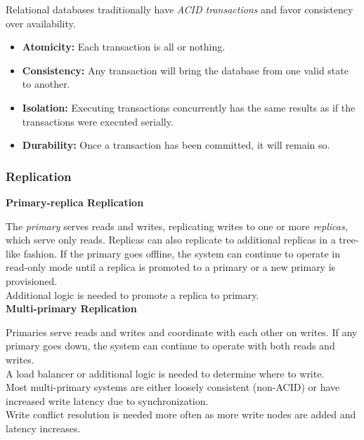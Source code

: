 \documentclass[12pt, titlepage]{article}
\begin{document}
Relational databases traditionally have \textit{ACID transactions} and favor consistency over availability. \\

\begin{itemize}
  \item \textbf{Atomicity:} Each transaction is all or nothing.
  \item \textbf{Consistency:} Any transaction will bring the database from one valid state to another.
  \item \textbf{Isolation:} Executing transactions concurrently has the same results as if the transactions were executed serially.
  \item \textbf{Durability:} Once a transaction has been committed, it will remain so.
\end{itemize}

\subsubsection{Replication}

\textbf{Primary-replica Replication} \medskip

The \textit{primary} serves reads and writes, replicating writes to one or more \textit{replicas}, which serve only reads. Replicas can also replicate to additional replicas in a tree-like fashion. If the primary goes offline, the system can continue to operate in read-only mode until a replica is promoted to a primary or a new primary is provisioned. \\

Additional logic is needed to promote a replica to primary. \\

\textbf{Multi-primary Replication} \medskip

Primaries serve reads and writes and coordinate with each other on writes. If any primary goes down, the system can continue to operate with both reads and writes. \\

A load balancer or additional logic is needed to determine where to write. \\

Most multi-primary systems are either loosely consistent (non-ACID) or have increased write latency due to synchronization. \\

Write conflict resolution is needed more often as more write nodes are added and latency increases. \\
\end{document}

